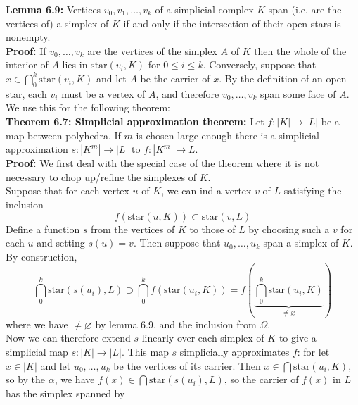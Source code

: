 \documentclass[a4paper]{article}
\begin{document}
\textbf{Lemma 6.9:} Vertices $v_0, v_1, \ldots, v_k$ of a simplicial complex
$K$ span (i.e. are the vertices of) a simplex of $K$ if and only if the
intersection of their open stars is nonempty.\\
\linebreak
\textbf{Proof:} If $v_0, \ldots, v_k$ are the vertices of the simplex $A$ of
$K$ then the whole of the interior of $A$ lies in $\text{star}(v_i, K)$ for
$0 \le  i \le k$. Conversely, suppose that 
$x \in \bigcap_{0}^{k}\text{star}(v_i, K)$ and let $A$ be the carrier of $x$.
By the definition of an open star, each $v_i$ must be a vertex of
$A$, and therefore $v_0, \ldots, v_k$ span some face of $A$.\\
\linebreak
We use this for the following theorem:\\
\textbf{Theorem 6.7: Simplicial approximation theorem:} Let $f \colon \left| K \right| 
\to \left| L \right| $ be a map between polyhedra. If
$m$ is chosen large enough there is a simplicial approximation
$s  \colon \left| K^{m} \right| 
\to \left| L \right| $ to
$f  \colon \left| K^{m} \right| \to L$.\\
\linebreak
\textbf{Proof:} We first deal with the special case of the theorem where
it is not necessary to chop up/refine the simplexes of $K$.\\
Suppose that for each vertex $u$ of $K$, we can ind a vertex
$v$ of $L$ satisfying the inclusion
\[
f\left( \text{star}(u, K) \right) 
\subset \text{star}(v,L) \tag{$\Omega$}
\] 
Define a function $s$ from the vertices of $K$ to those of $L$ by choosing such
a $v$ for each $u$ and setting $s(u) = v$. Then suppose that
$u_0, \ldots, u_k$ span a simplex of $K$. \\
By construction,
\[
\bigcap_{0}^{k} \text{star}(s(u_i),L)
\supset \bigcap_{0}^{k} f\left( \text{star}(u_i,K) \right) 
= f \left( \underbrace{\bigcap_{0}^{k}\text{star}(u_i,K)}_{\neq \varnothing} \right) 
\tag{$\alpha$}
\] 
where we have $\neq \varnothing$ by lemma 6.9. and the inclusion
from $\Omega$.\\
Now we can therefore extend $s$ linearly over each simplex of $K$ to give a 
simplicial map $s  \colon \left| K \right| \to 
\left| L \right| $. This map
$s$ simplicially approximates $f$: for let
$x \in \left| K \right| $ and let $u_0, \ldots, u_k$ be the vertices of
its carrier. Then $x \in \bigcap \text{star}(u_i,K)$, so by
the $\alpha$, we have
$f(x) \in \bigcap \text{star}(s(u_i),L) $, so
the carrier of $f(x)$ in $L$ has the simplex spanned by
\end{document}
